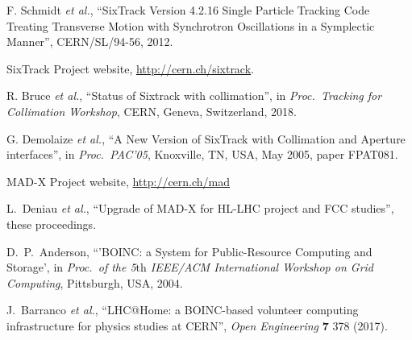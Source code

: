 \documentclass[a4paper,
              ]{jacow}
\begin{document}
\begin{thebibliography}{99}


F. Schmidt {\it et al.},
``SixTrack Version 4.2.16 Single Particle Tracking Code Treating Transverse Motion with Synchrotron Oscillations in a Symplectic Manner'',
CERN/SL/94-56, 2012.

SixTrack Project website,
\url{http://cern.ch/sixtrack}.

R. Bruce {\it et al.},
``Status of Sixtrack with collimation'',
in \emph{Proc.~Tracking for Collimation Workshop}, CERN, Geneva, Switzerland, 2018.


G. Demolaize {\it et al.}, ``A New Version of SixTrack with Collimation and Aperture interfaces'', in {\it Proc.~PAC'05}, Knoxville, TN, USA, May 2005, paper FPAT081.

MAD-X Project website, \url{http://cern.ch/mad}


L.~Deniau {\it et al.},
``Upgrade of MAD-X for HL-LHC project and FCC studies'',
these proceedings.

 D.~P.~Anderson, ``'BOINC: a System for Public-Resource Computing and Storage',
in \emph{Proc.~of the 5$\textrm{th}$ IEEE/ACM International Workshop on Grid Computing}, Pittsburgh, USA, 2004.

J.~Barranco \emph{et al.},
``LHC@Home: a BOINC-based volunteer computing infrastructure for physics studies at CERN'',
{\it Open Engineering} {\bf 7} 378 (2017).


\end{thebibliography}
\end{document}
